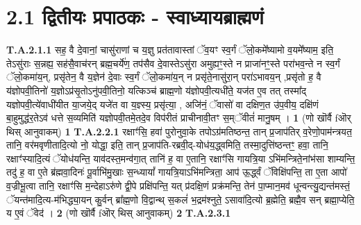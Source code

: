 \documentclass[17pt]{extarticle}
\begin{document}
\section*{ 2.1     द्वितीयः प्रपाठकः - स्वाध्यायब्राह्मणं }
                                \textbf{ T.A.2.1.1} \newline
                  सह॒ वै दे॒वानां॒ चासु॑राणां च य॒ज्ञु प्रत॑तावास्तां ॅव॒यꣳ स्व॒र्गं ॅलो॒कमे᳚ष्यामो व॒यमे᳚ष्याम॒ इति॒ तेऽसु॑राः स॒न्नह्य॒ सह॑सै॒वाच॑रन् ब्रह्म॒चर्ये॑ण॒ तप॑सैव दे॒वास्तेऽसु॑रा अमुह्यꣳ॒॒स्ते न प्राजा॑नꣳ॒॒स्ते परा॑भव॒न्ते न स्व॒र्गं ॅलो॒कमा॑य॒न्, प्रसृ॑तेन॒ वै य॒ज्ञेन॑ दे॒वाः स्व॒र्गं ॅलो॒कमा॑य॒न् न प्रसृ॑ते॒नासु॑रा॒न् परा॑ऽभावय॒न् ,प्रसृ॑तो ह॒ वै य॑ज्ञोपवी॒तिनो॑ य॒ज्ञोऽप्र॑सृ॒तोऽनु॑पवी॒तिनो॒ यत्किञ्च॑ ब्राह्म॒णो य॑ज्ञोपवी॒त्यधी॑ते॒ यज॑त ए॒व तत् तस्मा᳚द् यज्ञोपवी॒त्ये॑वाधी॑यीत या॒जये॒द् यजे॑त वा य॒ज्ञ्स्य॒ प्रसृ॑त्या॒ , अजि॑नं॒ ॅवासो॑ वा दक्षिण॒त उ॑प॒वीय॒ दक्षि॑णं बा॒हुमुद्ध॑र॒तेऽव॑ धत्ते स॒व्यमिति॑ यज्ञोपवी॒तमे॒तदे॒व विप॑रीतं प्राचीनावी॒तꣳ स॒म्ॅवीतं॑ मानु॒षम् । \textbf{ 1} \newline
                  \newline
                                                        (णो खॊर्वै fऒर् थिस् आनुवाकम्) \textbf{1} \newline \newline
                                \textbf{ T.A.2.2.1} \newline
                  रक्षाꣳ॑सि॒ हवा॑ पुरोनुवा॒के तपोऽग्र॑मतिष्ठन्त॒ तान् प्र॒जाप॑तिर् व॒रेणो॒पाम॑न्त्रयत॒ तानि॒ वर॑मवृणीतादि॒त्यो नो॒ योद्धा॒ इति॒ तान् प्र॒जाप॑ति-रब्रवी॒द्-योध॑य॒द्ध्वमिति॒ तस्मा॒दुत्ति॑ष्ठन्तꣳ॒॒ हवा॒ तानि॒ रक्षाꣳ॑स्यादि॒त्यं ॅयोध॑यन्ति॒ याव॑दस्त॒मन्व॑गा॒त्  तानि॑ ह॒ वा ए॒तानि॒ रक्षाꣳ॑सि गायत्रि॒या ऽभि॑मन्त्रिते॒नांभ॑सा शाम्यन्ति॒ तदु॑ ह॒ वा ए॒ते ब्र॑ह्मवा॒दिनः॑ पू॒र्वाभि॑मु॒खाः स॒न्ध्यायां᳚ गायत्रि॒याऽभि॑मन्त्रिता॒ आप॑ ऊ॒र्द्ध्वं ॅविक्षि॑पन्ति॒ ता ए॒ता आपो॑ व॒ज्रीभू॒त्वा तानि॒ रक्षाꣳ॑सि  म॒न्देहाऽरु॑णे द्वी॒पे प्रक्षि॑पन्ति॒ यत् प्र॑दक्षि॒णं प्रक्र॑मन्ति॒ तेन॑ पा॒प्मान॒मव॑ धून्वन्त्यु॒द्यन्त॑मस्तं॒ ॅयन्त॑मादि॒त्य-म॑भिद्ध्या॒यन् कु॒र्वन् ब्रा᳚ह्म॒णो वि॒द्वान्थ् स॒कलं॑ भ॒द्रम॑श्नुते॒ ऽसावा॑दि॒त्यो ब्र॒ह्मेति॒ ब्रह्मै॒व सन् ब्रह्मा॒प्येति॒ य ए॒वं ॅवेद॑ । \textbf{ 2} \newline
                  \newline
                                                        (णो खॊर्वै fऒर् थिस् आनुवाकम्) \textbf{2} \newline \newline
                                \textbf{ T.A.2.3.1} \newline
\end{document}
